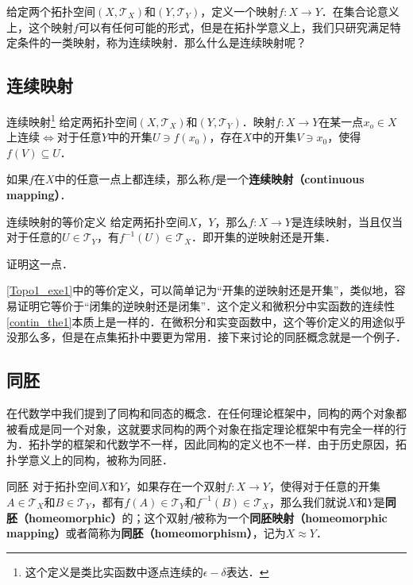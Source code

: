 

给定两个拓扑空间$(X, \mathcal{T}_X)$和$(Y, \mathcal{T}_Y)$，定义一个映射$f:X\rightarrow Y$．在集合论意义上，这个映射$f$可以有任何可能的形式，但是在拓扑学意义上，我们只研究满足特定条件的一类映射，称为连续映射．那么什么是连续映射呢？

\subsection{连续映射}
\begin{definition}{连续映射\footnote{这个定义是类比实函数中逐点连续的$\epsilon-\delta$表达．}}
给定两拓扑空间$(X, \mathcal{T}_X)$和$(Y, \mathcal{T}_Y)$．映射$f:X\rightarrow Y$在某一点$x_o\in X$上连续$\iff$对于任意$Y$中的开集$U\ni f(x_0)$，存在$X$中的开集$V\ni x_0$，使得$f(V)\subseteq U$．

如果$f$在$X$中的任意一点上都连续，那么称$f$是一个\textbf{连续映射（continuous mapping）}．
\end{definition}

\begin{exercise}{连续映射的等价定义}\label{Topo1_exe1}
给定两拓扑空间$X$，$Y$，那么$f:X\rightarrow Y$是连续映射，当且仅当对于任意的$U\in\mathcal{T}_Y$，有$f^{-1}(U)\in\mathcal{T}_X$．即开集的逆映射还是开集．

证明这一点．
\end{exercise}

\autoref{Topo1_exe1}中的等价定义，可以简单记为“开集的逆映射还是开集”，类似地，容易证明它等价于“闭集的逆映射还是闭集”．这个定义和微积分中实函数的连续性\autoref{contin_the1}本质上是一样的．在微积分和实变函数中，这个等价定义的用途似乎没那么多，但是在点集拓扑中要更为常用．接下来讨论的同胚概念就是一个例子．

\subsection{同胚}

在代数学中我们提到了同构和同态的概念．在任何理论框架中，同构的两个对象都被看成是同一个对象，这就要求同构的两个对象在指定理论框架中有完全一样的行为．拓扑学的框架和代数学不一样，因此同构的定义也不一样．由于历史原因，拓扑学意义上的同构，被称为同胚．

\begin{definition}{同胚}
对于拓扑空间$X$和$Y$，如果存在一个双射$f:X\rightarrow Y$，使得对于任意的开集$A\in\mathcal{T}_X$和$B\in\mathcal{T}_Y$，都有$f(A)\in\mathcal{T}_Y$和$f^{-1}(B)\in\mathcal{T}_X$，那么我们就说$X$和$Y$是\textbf{同胚（homeomorphic）}的；这个双射$f$被称为一个\textbf{同胚映射（homeomorphic mapping）}或者简称为\textbf{同胚（homeomorphism）}，记为$X\approx Y$．
\end{definition}

